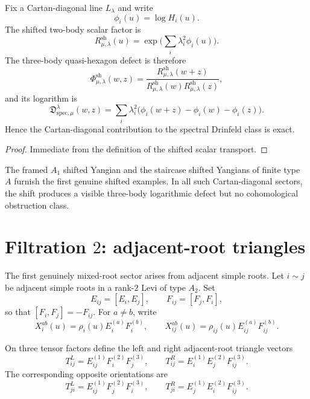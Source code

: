 \begin{theorem}
\ClaimStatusProvedHere
\label{thm:cartan-diagonal-defect-exact}
Fix a Cartan-diagonal line $L_\lambda$ and write
\[
\phi_i(u)=\log H_i(u).
\]
The shifted two-body scalar factor is
\[
R_{\mu,\lambda}^{\mathrm{sh}}(u)=
\exp\!\Big(\sum_i \lambda_i^2\phi_i(u)\Big).
\]
The three-body quasi-hexagon defect is therefore
\[
\Phi_{\mu,\lambda}^{\mathrm{sh}}(w,z)=
\frac{R_{\mu,\lambda}^{\mathrm{sh}}(w+z)}{R_{\mu,\lambda}^{\mathrm{sh}}(w)
R_{\mu,\lambda}^{\mathrm{sh}}(z)},
\]
and its logarithm is
\[
\mathfrak D_{\mathrm{spec},\mu}^{\lambda}(w,z)=
\sum_i \lambda_i^2\big(\phi_i(w+z)-\phi_i(w)-\phi_i(z)\big).
\]
Hence the Cartan-diagonal contribution to the spectral Drinfeld class is
exact.
\end{theorem}

\begin{proof}
Immediate from the definition of the shifted scalar transport.
\end{proof}

\begin{remark}
The framed $A_1$ shifted Yangian and the staircase shifted Yangians of
finite type~$A$ furnish the first genuine shifted examples.  In all such
Cartan-diagonal sectors, the shift produces a visible three-body
logarithmic defect but no cohomological obstruction class.
\end{remark}

\section{Filtration $2$: adjacent-root triangles}

The first genuinely mixed-root sector arises from adjacent simple roots.
Let $i\sim j$ be adjacent simple roots in a rank-$2$ Levi of type $A_2$.
Set
\[
E_{ij}=[E_i,E_j],
\qquad
F_{ij}=[F_j,F_i],
\]
so that $[F_i,F_j]=-F_{ij}$.
For $a\neq b$, write
\[
X_i^{ab}(u)=\rho_i(u)E_i^{(a)}F_i^{(b)},
\qquad
X_{ij}^{ab}(u)=\rho_{ij}(u)E_{ij}^{(a)}F_{ij}^{(b)}.
\]

\begin{definition}
On three tensor factors define the left and right adjacent-root triangle
vectors
\[
T_{ij}^{L}=E_{ij}^{(1)}F_i^{(2)}F_j^{(3)},
\qquad
T_{ij}^{R}=E_i^{(1)}E_j^{(2)}F_{ij}^{(3)}.
\]
The corresponding opposite orientations are
\[
T_{ji}^{L}=E_{ij}^{(1)}F_j^{(2)}F_i^{(3)},
\qquad
T_{ji}^{R}=E_j^{(1)}E_i^{(2)}F_{ij}^{(3)}.
\]
\end{definition}

